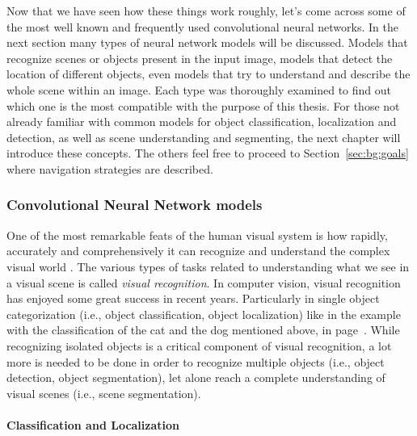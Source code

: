 \documentclass[12pt,a4paper,table,dvipsnames,tikz]{report}
\newcommand{\term}{\textit}
\begin{document}
	Now that we have seen how these things work roughly, let's come across some of 
	the most well known and frequently used convolutional neural networks. In the 
	next section many types of neural network models will be discussed. Models that 
	recognize scenes or objects present in the input image, models that detect the 
	location of different objects, even models that try to understand and describe 
	the whole scene within an image. Each type was thoroughly examined to find out 
	which one is the most compatible with the purpose of this thesis. For those 
	not already familiar with common models for object classification, localization 
	and detection, as well as scene understanding and segmenting, the next chapter 
	will introduce these concepts. The others feel free to proceed to 
	Section~\ref{sec:bg:goals} where navigation strategies are described.
	\\
	
	
	\subsubsection{Convolutional Neural Network models}
	\label{sec:bg:data:neural:models}
	
	One of the most remarkable feats of the human visual system is how rapidly, 
	accurately and comprehensively it can recognize and understand the complex visual 
	world \citep{Socher}. The various types of tasks related to understanding what 
	we see in a visual scene is called \term{visual recognition}. In computer vision, 
	visual recognition has enjoyed some great success in recent years. Particularly 
	in single object categorization (i.e., object classification, object localization) 
	like in the example with the classification of the cat and the dog mentioned above, 
	in page~\pageref{eg:cat_dog}. 
	While recognizing isolated objects is a critical component of visual recognition, 
	a lot more is needed to be done in order to recognize multiple objects (i.e., 
	object detection, object segmentation), let alone reach a complete understanding 
	of visual scenes (i.e., scene segmentation).
	\\
	
	\paragraph{Classification and Localization}
	\label{sec:bg:data:neural:models:cl}
	
\end{document}

